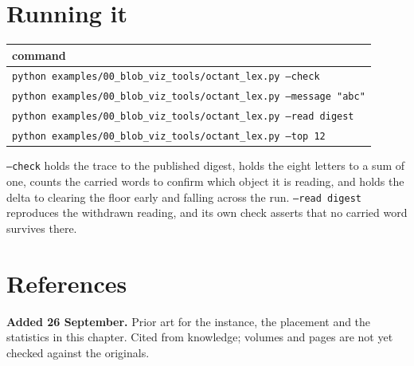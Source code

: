 \section{Running it}

\begin{center}
\begin{tabular}{@{}l@{}}
\toprule
command \\
\midrule
\texttt{python examples/00\_blob\_viz\_tools/octant\_lex.py --check} \\
\texttt{python examples/00\_blob\_viz\_tools/octant\_lex.py --message "abc"} \\
\texttt{python examples/00\_blob\_viz\_tools/octant\_lex.py --read digest} \\
\texttt{python examples/00\_blob\_viz\_tools/octant\_lex.py --top 12} \\
\bottomrule
\end{tabular}
\end{center}

\texttt{--check} holds the trace to the published digest, holds the eight letters to a sum of one, counts the carried words to confirm which object it is reading, and holds the delta to clearing the floor early and falling across the run. \texttt{--read digest} reproduces the withdrawn reading, and its own check asserts that no carried word survives there.

\section{References}

\textbf{Added 26 September.} Prior art for the instance, the placement and the statistics in this chapter. Cited from knowledge; volumes and pages are not yet checked against the originals.

